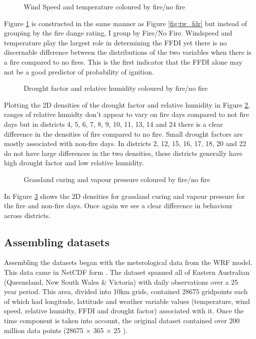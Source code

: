 \documentclass{article}
\begin{document}
\begin{figure}[h]
	\centering 
	\caption{Wind Speed and temperature coloured by fire/no fire} 
	\label{fig:tw_fire} 
\end{figure}

Figure \ref{fig:tw_fire} is constructed in the same manner as Figure \ref{fig:tw_fdr} but instead of grouping by the fire dange rating, I group by Fire/No Fire. Windspeed and temperature play the largest role in determining the FFDI yet there is no discernable difference between the distributions of the two variables when there is a fire compared to no fires. This is the first indicator that the FFDI alone may not be a good predictor of probability of ignition. 

\begin{figure}[h]
	\centering 
	\caption{Drought factor and relative humidity coloured by fire/no fire} 
	\label{fig:dh_fire} 
\end{figure}

Plotting the 2D densities of the drought factor and relative humidity in Figure \ref{fig:dh_fire}, ranges of relative humidty don't appear to vary on fire days compared to not fire days but in districts 4, 5, 6, 7, 8, 9, 10, 11, 13, 14 and 24 there is a clear difference in the densities of fire compared to no fire. Small drought factors are mostly associated with non-fire days. In districts 2, 12, 15, 16, 17, 18, 20 and 22 do not have large differences in the two densities, these districts generally have high drought factor and low relative humidity. 

\begin{figure}[h]
	\centering 
	\caption{Grassland curing and vapour pressure coloured by fire/no fire} 
	\label{fig:gv_fire} 
\end{figure}

In Figure \ref{fig:gv_fire} shows the 2D densities for grassland curing and vapour pressure for the fire and non-fire days. Once again we see a clear difference in behaviour across districts.  

\subsection{Assembling datasets}

Assembling the datasets began with the meterological data from the WRF model. This data came in NetCDF form \citep{ncdf}. The dataset spanned all of Eastern Australian (Queensland, New South Wales \& Victoria) with daily observations over a 25 year period. This area, divided into 10km grids, contained 28675 gridpoints each of which had longitude, lattitude and weather variable values (temperature, wind speed, relative humidty, FFDI and drought factor) associated with it. Once the time component is taken into account, the original dataset contained over 200 million data points (28675 $\times$ 365 $\times$ 25 ). 
\end{document}
